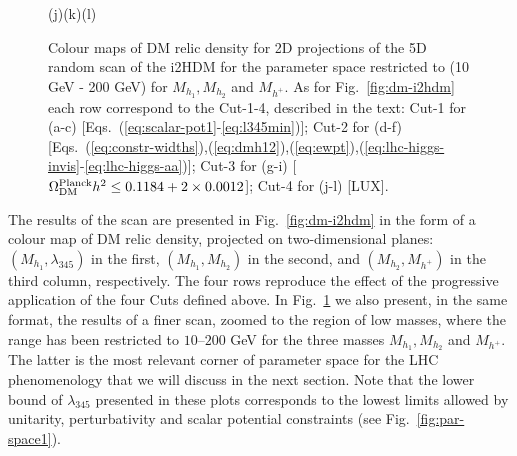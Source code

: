\documentclass[12pt,a4paper]{article}
\begin{document}
\begin{figure}[htb]
\vskip 0.2cm
\hspace*{1.4cm}(j)\hspace*{0.35\textwidth}\hspace*{-1.5cm}(k)\hspace*{0.35\textwidth}\hspace*{-1.6cm}(l)
\caption{Colour maps of DM relic density for 2D projections of the 5D random scan of the
i2HDM for the parameter space restricted to (10 GeV - 200 GeV) for $M_{h_1},M_{h_2}$ and
$M_{h^{+}}$. As for Fig.~\ref{fig:dm-i2hdm} each row correspond to the Cut-1-4, described in the text: Cut-1 for (a-c) [Eqs.~(\ref{eq:scalar-pot1}-\ref{eq:l345min})]; Cut-2 for (d-f) [Eqs.~(\ref{eq:constr-widths}),(\ref{eq:dmh12}),(\ref{eq:ewpt}),(\ref{eq:lhc-higgs-invis}-\ref{eq:lhc-higgs-aa})]; Cut-3 for (g-i) [$\Omega_{\rm DM}^{\rm Planck} h^2 \le 0.1184+2\times 0.0012$]; Cut-4 for (j-l) [LUX].\label{fig:dm-i2hdm-small}}
\end{figure}

The results of the  scan are  presented in Fig.~\ref{fig:dm-i2hdm} in the form of a colour map of
DM relic density, projected on two-dimensional planes: $(M_{h_1},\lambda_{345})$ in the first,
$(M_{h_1},M_{h_2})$ in the second, and $(M_{h_2},M_{h^{+}})$ in the third column, respectively.
The four rows reproduce the effect of the progressive application of the four Cuts defined above.
In Fig.~\ref{fig:dm-i2hdm-small} we also present, in the same format, the results of a finer scan, zoomed to the region of low masses, where the range has been restricted to $10$--$200$ GeV for the three masses $M_{h_1},M_{h_2}$ and $M_{h^{+}}$. The latter is the most relevant corner of parameter space for the LHC phenomenology that we will discuss in the next section. Note that the lower bound of $\lambda_{345}$ presented in these plots corresponds to the lowest limits allowed by unitarity, perturbativity and scalar potential constraints (see Fig.~\ref{fig:par-space1}).
\end{document}
